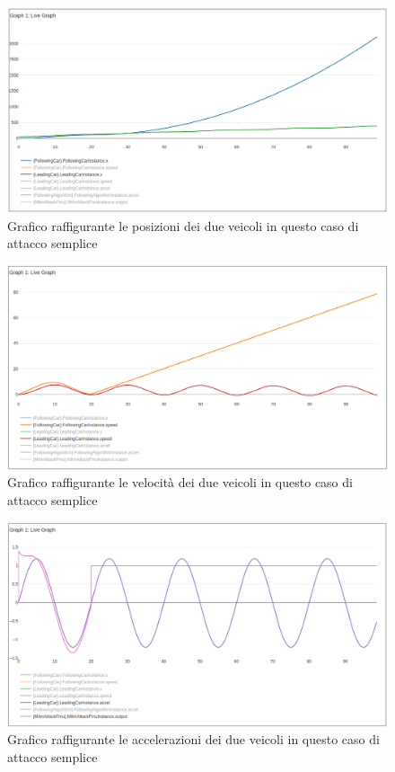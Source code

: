 \begin{figure}[H]
	\centering
	\includegraphics[width=\textwidth]{img/AttackAccel1X.png}
	\caption{Grafico raffigurante le posizioni dei due veicoli in questo caso di attacco semplice}
\end{figure}

\begin{figure}[H]
	\centering
	\includegraphics[width=\textwidth]{img/AttackAccel1Speed.png}
	\caption{Grafico raffigurante le velocità dei due veicoli in questo caso di attacco semplice}
\end{figure}

\begin{figure}[H]
	\centering
	\includegraphics[width=\textwidth]{img/AttackAccel1Accel.png}
	\caption{Grafico raffigurante le accelerazioni dei due veicoli in questo caso di attacco semplice}
\end{figure}

